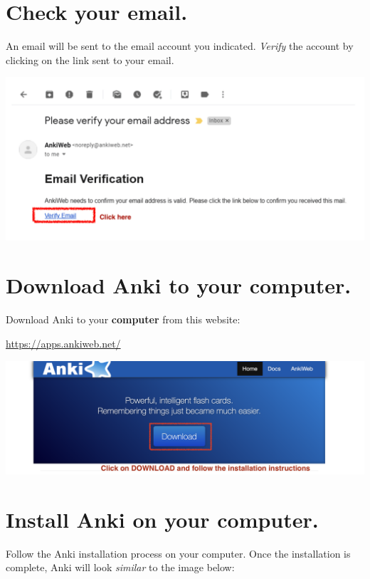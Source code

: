 \documentclass[
]{book}
\begin{document}
\hypertarget{check-your-email.}{%
\section{Check your email.}\label{check-your-email.}}

An email will be sent to the email account you indicated. \emph{Verify} the account by clicking on the link sent to your email.

\includegraphics[width=1\linewidth]{images/reposit_en/email_verification}

\hypertarget{download-anki-to-your-computer.}{%
\section{Download Anki to your computer.}\label{download-anki-to-your-computer.}}

Download Anki to your \textbf{computer} from this website:

\url{https://apps.ankiweb.net/}

\includegraphics[width=1\linewidth]{images/reposit_en/download}

\hypertarget{install-anki-on-your-computer.}{%
\section{Install Anki on your computer.}\label{install-anki-on-your-computer.}}

Follow the Anki installation process on your computer. Once the installation is complete, Anki will look \emph{similar} to the image below:
\end{document}

